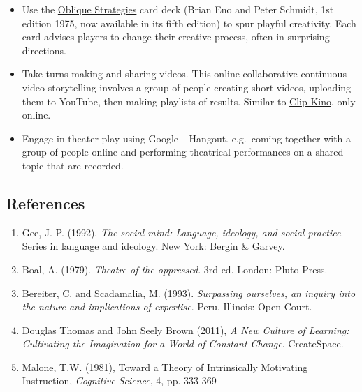 \begin{itemize}
\itemsep1pt\parskip0pt
\item
  Use the \href{http://www.rtqe.net/ObliqueStrategies/}{Oblique
  Strategies} card deck (Brian Eno and Peter Schmidt, 1st edition 1975,
  now available in its fifth edition) to spur playful creativity. Each
  card advises players to change their creative process, often in
  surprising directions.
\item
  Take turns making and sharing videos. This online collaborative
  continuous video storytelling involves a group of people creating
  short videos, uploading them to YouTube, then making playlists of
  results. Similar to \href{http://clipkino.info/}{Clip Kino}, only
  online.
\item
  Engage in theater play using Google+ Hangout. e.g.~coming together
  with a group of people online and performing theatrical performances
  on a shared topic that are recorded.
\end{itemize}

\subsection{References}

\begin{enumerate}
\itemsep1pt\parskip0pt
\item
  Gee, J. P. (1992). \emph{The social mind: Language, ideology, and
  social practice}. Series in language and ideology. New York: Bergin \&
  Garvey.
\item
  Boal, A. (1979). \emph{Theatre of the oppressed}. 3rd ed. London:
  Pluto Press.
\item
  Bereiter, C. and Scadamalia, M. (1993). \emph{Surpassing ourselves, an
  inquiry into the nature and implications of expertise}. Peru,
  Illinois: Open Court.
\item
  Douglas Thomas and John Seely Brown (2011), \emph{A New Culture of
  Learning: Cultivating the Imagination for a World of Constant Change}.
  CreateSpace.
\item
  Malone, T.W. (1981), Toward a Theory of Intrinsically Motivating
  Instruction, \emph{Cognitive Science}, 4, pp. 333-369
\end{enumerate}
